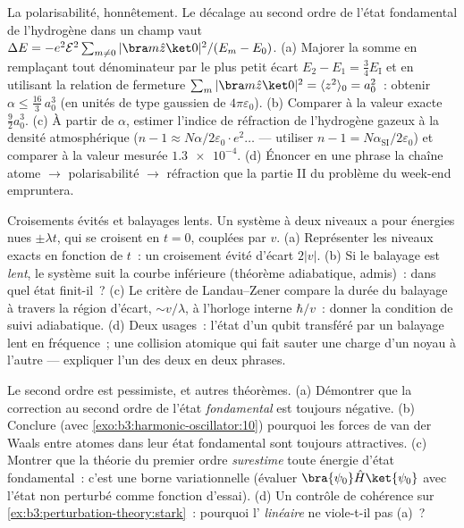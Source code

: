 \begin{exercise}[$\star\star\star$]\label{exo:b3:perturbation-theory:10}
La polarisabilité, honnêtement. Le décalage au second ordre de l'état
fondamental de l'hydrogène dans un champ vaut $\Delta E = -e^2\mathcal E^2\sum_{m\neq
0}|\bra m\hat z\ket 0|^2/(E_m - E_0)$. (a) Majorer la somme en
remplaçant tout dénominateur par le plus petit écart $E_2 - E_1 =
\tfrac34 E_{\text{I}}$ et en utilisant la relation de fermeture $\sum_m|\bra
m\hat z\ket0|^2 = \langle z^2\rangle_0 = a_0^2$~: obtenir $\alpha
\le \tfrac{16}3\,a_0^3$ (en unités de type gaussien de
$4\pi\varepsilon_0$). (b) Comparer à la valeur exacte $\tfrac92 a_0^3$.
(c) À partir de $\alpha$, estimer l'indice de réfraction de
l'hydrogène gazeux à la densité atmosphérique ($n - 1 \approx N\alpha/2\varepsilon_0
\cdot e^2\dots$ --- utiliser $n - 1 = N\alpha_{\text{SI}}/2
\varepsilon_0$) et comparer à la valeur mesurée $\num{1.3e-4}$.
(d) Énoncer en une phrase la chaîne atome $\to$ polarisabilité
$\to$ réfraction que la partie II du problème du week-end empruntera.
\end{exercise}

\begin{exercise}[$\star\star\star$]\label{exo:b3:perturbation-theory:11}
Croisements évités et balayages lents. Un système à deux niveaux a
pour énergies nues $\pm\lambda t$, qui se croisent en $t = 0$, couplées
par $v$. (a) Représenter les niveaux exacts en fonction de $t$~: un
croisement évité d'écart $2|v|$. (b) Si le balayage est \emph{lent},
le système suit la courbe inférieure (théorème adiabatique, admis)~:
dans quel état finit-il~? (c) Le critère de Landau--Zener compare la
durée du balayage à travers la région d'écart, $\sim v/\lambda$, à
l'horloge interne $\hbar/v$~: donner la condition de suivi
adiabatique. (d) Deux usages~: l'état d'un qubit transféré par un
balayage lent en fréquence~; une collision atomique qui fait sauter
une charge d'un noyau à l'autre --- expliquer l'un des deux en deux
phrases.
\end{exercise}

\begin{exercise}[$\star\star\star$]\label{exo:b3:perturbation-theory:12}
Le second ordre est pessimiste, et autres théorèmes. (a) Démontrer que
la correction au second ordre de l'état \emph{fondamental} est
toujours négative. (b) Conclure (avec
\cref{exo:b3:harmonic-oscillator:10}) pourquoi les forces de van der
Waals entre atomes dans leur état fondamental sont toujours
attractives. (c) Montrer que la théorie du premier ordre
\emph{surestime} toute énergie d'état fondamental~: c'est une borne
variationnelle (évaluer $\bra{\psi_0}\hat
H\ket{\psi_0}$ avec l'état non perturbé comme fonction d'essai). (d)
Un contrôle de cohérence sur \cref{ex:b3:perturbation-theory:stark}~:
pourquoi l' \emph{linéaire} ne viole-t-il pas (a)~?
\end{exercise}

